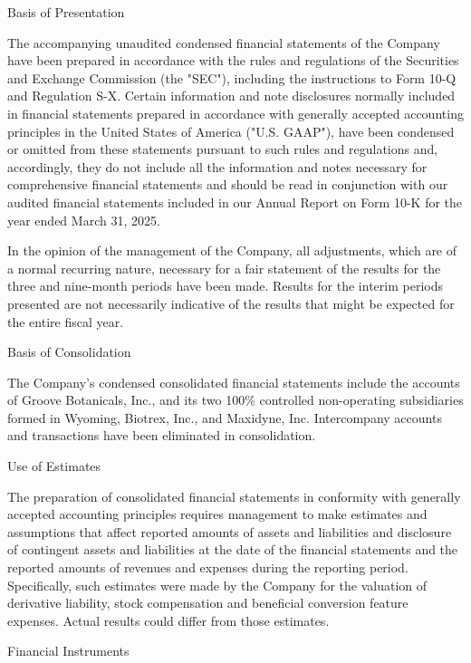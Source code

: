 \documentclass[11pt,a4paper]{article}
\begin{document}
Basis of Presentation

The accompanying unaudited condensed financial statements of the Company have been prepared in accordance with the rules and regulations of the Securities and Exchange Commission (the "SEC"), including the instructions to Form 10-Q and Regulation S-X. Certain information and note disclosures normally included in financial statements prepared in accordance with generally accepted accounting principles in the United States of America ("U.S. GAAP"), have been condensed or omitted from these statements pursuant to such rules and regulations and, accordingly, they do not include all the information and notes necessary for comprehensive financial statements and should be read in conjunction with our audited financial statements included in our Annual Report on Form 10-K for the year ended March 31, 2025.

In the opinion of the management of the Company, all adjustments, which are of a normal recurring nature, necessary for a fair statement of the results for the three and nine-month periods have been made. Results for the interim periods presented are not necessarily indicative of the results that might be expected for the entire fiscal year.

Basis of Consolidation

The Company's condensed consolidated financial statements include the accounts of Groove Botanicals, Inc., and its two 100\% controlled non-operating subsidiaries formed in Wyoming, Biotrex, Inc., and Maxidyne, Inc. Intercompany accounts and transactions have been eliminated in consolidation.

Use of Estimates

The preparation of consolidated financial statements in conformity with generally accepted accounting principles requires management to make estimates and assumptions that affect reported amounts of assets and liabilities and disclosure of contingent assets and liabilities at the date of the financial statements and the reported amounts of revenues and expenses during the reporting period. Specifically, such estimates were made by the Company for the valuation of derivative liability, stock compensation and beneficial conversion feature expenses. Actual results could differ from those estimates.

Financial Instruments
\end{document}
